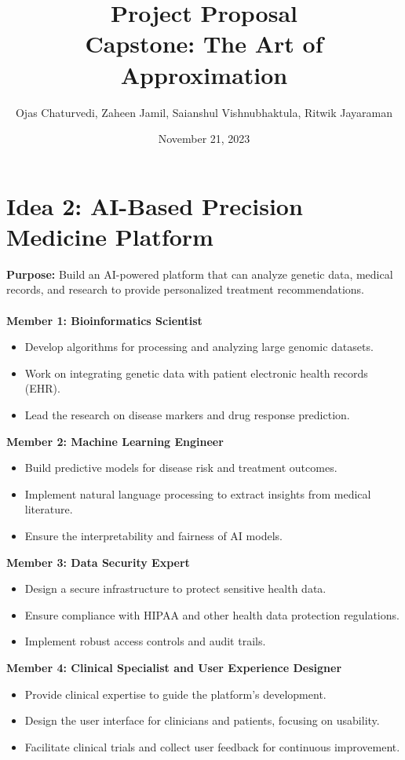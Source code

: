 \documentclass{article}
\title{Project Proposal \\ \large Capstone: The Art of Approximation}
\author{Ojas Chaturvedi, Zaheen Jamil, Saianshul Vishnubhaktula, Ritwik Jayaraman}
\date{November 21, 2023}
\begin{document}
\begin{titlingpage}
    \maketitle
    \tableofcontents
\end{titlingpage}


\newpage \section{Idea 2: AI-Based Precision Medicine Platform}
    \textbf{Purpose:} Build an AI-powered platform that can analyze genetic data, medical records, and research to provide personalized treatment recommendations. \\ \\
    \textbf{Member 1: Bioinformatics Scientist}
        \begin{itemize}
            \item Develop algorithms for processing and analyzing large genomic datasets.
            \item Work on integrating genetic data with patient electronic health records (EHR).
            \item Lead the research on disease markers and drug response prediction.
        \end{itemize}
    \textbf{Member 2: Machine Learning Engineer}
        \begin{itemize}
            \item Build predictive models for disease risk and treatment outcomes.
            \item Implement natural language processing to extract insights from medical literature.
            \item Ensure the interpretability and fairness of AI models.
        \end{itemize}
    \textbf{Member 3: Data Security Expert}
        \begin{itemize}
            \item Design a secure infrastructure to protect sensitive health data.
            \item Ensure compliance with HIPAA and other health data protection regulations.
            \item Implement robust access controls and audit trails.
        \end{itemize}
    \textbf{Member 4: Clinical Specialist and User Experience Designer}
        \begin{itemize}
            \item Provide clinical expertise to guide the platform's development.
            \item Design the user interface for clinicians and patients, focusing on usability.
            \item Facilitate clinical trials and collect user feedback for continuous improvement.
        \end{itemize}
\end{document}
